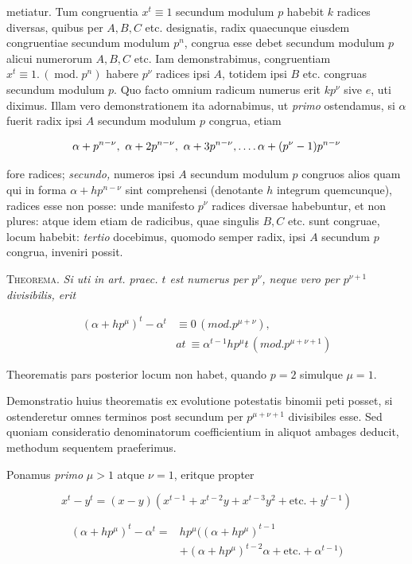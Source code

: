 metiatur. Tum congruentia $x^t\equiv1$ secundum modulum $p$ habebit $k$ radices diversas, quibus per $A,B,C$ etc. designatis, radix quaecunque eiusdem congruentiae secundum modulum $p^n$, congrua esse debet secundum modulum $p$ alicui numerorum $A,B,C$ etc. Iam demonstrabimus, congruentiam $x^t\equiv1.\,(\operatorname{mod.}p^n)$ habere $p^{\nu}$ radices ipsi $A$, totidem ipsi $B$ etc. congruas secundum modulum $p$. Quo facto omnium radicum numerus erit $kp^{\nu}$ sive $e$, uti diximus. Illam vero demonstrationem ita adornabimus, ut \emph{primo} ostendamus, si $\alpha$ fuerit radix ipsi $A$ secundum modulum $p$ congrua, etiam

\[\alpha+p^{n-\nu},\ \alpha+2p^{n-\nu},\ \alpha+3p^{n-\nu},\mathinner{.\,.\,.\,.}\alpha+(p^{\nu}-1)p^{n-\nu}\]

fore radices; \emph{secundo,} numeros ipsi $A$ secundum modulum $p$ congruos alios quam qui in forma $\alpha+hp^{n-\nu}$ sint comprehensi (denotante $h$ integrum quemcunque), radices esse non posse: unde manifesto $p^{\nu}$ radices diversae habebuntur, et non plures: atque idem etiam de radicibus, quae singulis $B,C$ etc. sunt congruae, locum habebit: \emph{tertio} docebimus, quomodo semper radix, ipsi $A$ secundum $p$ congrua, inveniri possit.


\textsc{Theorema.} \emph{Si uti in art. praec. $t$ est numerus per $p^{\nu}$, neque vero per $p^{\nu+1}$ divisibilis, erit}

\[\begin{aligned}
(\alpha+hp^{\mu})^t-\alpha^t&\equiv0\,(mod.p^{\mu+\nu}),\\
&\textit{at}\ \equiv\alpha^{t-1}hp^{\mu}t\,(mod.p^{\mu+\nu+1})
\end{aligned}\]

Theorematis pars posterior locum non habet, quando $p=2$ simulque $\mu=1$.

Demonstratio huius theorematis ex evolutione potestatis binomii peti posset, si ostenderetur omnes terminos post secundum per $p^{\mu+\nu+1}$ divisibiles esse. Sed quoniam consideratio denominatorum coefficientium in aliquot ambages deducit, methodum sequentem praeferimus.

Ponamus \emph{primo} $\mu>1$ atque $\nu=1$, eritque propter

\[x^t-y^t=(x-y)(x^{t-1}+x^{t-2}y+x^{t-3}y^2+\text{etc.}+y^{t-1})\]

\[\begin{aligned}
(\alpha+hp^{\mu})^t-\alpha^t={}&hp^{\mu}((\alpha+hp^{\mu})^{t-1}\\
&+(\alpha+hp^{\mu})^{t-2}\alpha+\text{etc.}+\alpha^{t-1})
\end{aligned}\]

